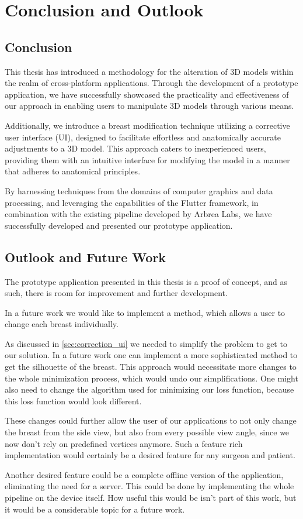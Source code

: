 \chapter{Conclusion and Outlook}

\section{Conclusion}

This thesis has introduced a methodology for the alteration of 3D models within the realm of cross-platform applications. Through the development of a prototype application, 
we have successfully showcased the practicality and effectiveness of our approach in enabling users to manipulate 3D models through various means.

Additionally, we introduce a breast modification technique utilizing a corrective user interface (UI), designed to facilitate effortless and anatomically accurate adjustments 
to a 3D model. This approach caters to inexperienced users, providing them with an intuitive interface for modifying the model in a manner that adheres to anatomical principles.

By harnessing techniques from the domains of computer graphics and data processing, and leveraging the capabilities of the Flutter framework, in combination with the existing 
pipeline developed by Arbrea Labs, we have successfully developed and presented our prototype application.

\section{Outlook and Future Work}

The prototype application presented in this thesis is a proof of concept, and as such, there is room for improvement and further development. 

In a future work we would like to implement a method, which allows a user to change each breast individually.

As discussed in \ref{sec:correction_ui} we needed to simplify the problem to get to our solution. In a future work one can implement a more sophisticated method to get the silhouette of the breast.
This approach would necessitate more changes to the whole minimization process, which would undo our simplifications. One might also need to change the algorithm used for minimizing our loss function, because
this loss function would look different.

These changes could further allow the user of our applications to not only change the breast from the side view, but also from every possible view angle, since we now don't rely on predefined vertices anymore.
Such a feature rich implementation would certainly be a desired feature for any surgeon and patient.

Another desired feature could be a complete offline version of the application, eliminating the need for a server. This could be done by implementing the whole pipeline on the device itself.
How useful this would be isn't part of this work, but it would be a considerable topic for a future work.


